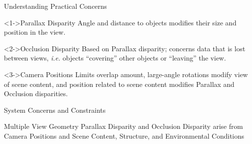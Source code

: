 \documentclass[serif]{beamer}
\begin{document}
\begin{frame}[c]{\sc Understanding Practical Concerns}


\begin{block}<1->{Parallax Disparity}
Angle and distance to objects modifies their size and position in the view.
\end{block}

\vfill

\begin{block}<2->{Occlusion Disparity}
Based on Parallax disparity; concerns data that is lost between views, \textit{i.e.} objects ``covering'' other objects or ``leaving'' the view.
\end{block}


\vfill

\begin{block}<3->{Camera Positions}
Limits overlap amount, large-angle rotations modify view of scene content, and position related to scene content modifies Parallax and Occlusion disparities.
\end{block}

\end{frame}


\begin{frame}[t]{\sc System Concerns and Constraints}

\begin{block}{Multiple View Geometry}
Parallax Disparity and Occlusion Disparity arise from Camera Positions and Scene Content, Structure, and Environmental Conditions
\end{block}

\end{frame}
\end{document}
